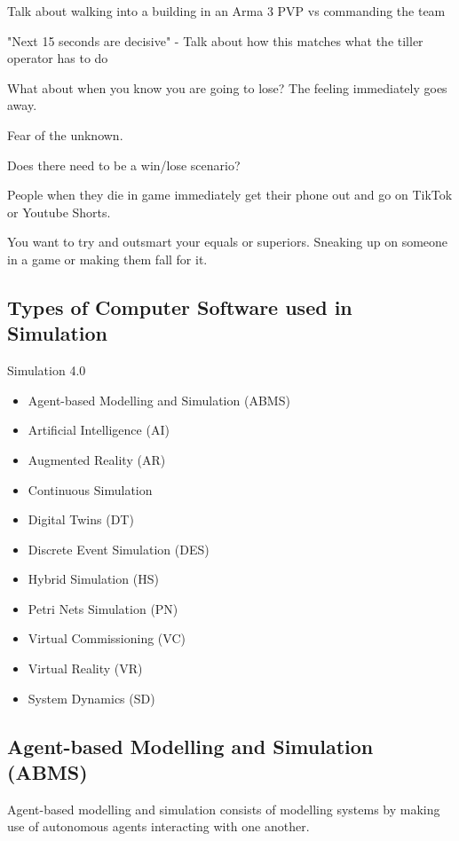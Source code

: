 \documentclass{article}
\begin{document}
Talk about walking into a building in an Arma 3 PVP vs commanding the team

"Next 15 seconds are decisive" - Talk about how this matches what the tiller operator has to do

What about when you know you are going to lose? The feeling immediately goes away. 

Fear of the unknown.

Does there need to be a win/lose scenario? 

People when they die in game immediately get their phone out and go on TikTok or Youtube Shorts.

You want to try and outsmart your equals or superiors. Sneaking up on someone in a game or making them fall for it.

\subsection{Types of Computer Software used in Simulation}

Simulation 4.0 \cite{DEPAULAFERREIRA2020106868}

\begin{itemize}
    \item Agent-based Modelling and Simulation (ABMS)
    \item Artificial Intelligence (AI)
    \item Augmented Reality (AR)
    \item Continuous Simulation
    \item Digital Twins (DT)
    \item Discrete Event Simulation (DES)
    \item Hybrid Simulation (HS)
    \item Petri Nets Simulation (PN)
    \item Virtual Commissioning (VC)
    \item Virtual Reality (VR)    
    \item System Dynamics (SD)    
\end{itemize}

\subsection{Agent-based Modelling and Simulation (ABMS)}

Agent-based modelling and simulation consists of modelling systems by making use of autonomous agents interacting with one another. \cite{1574234}
\end{document}
